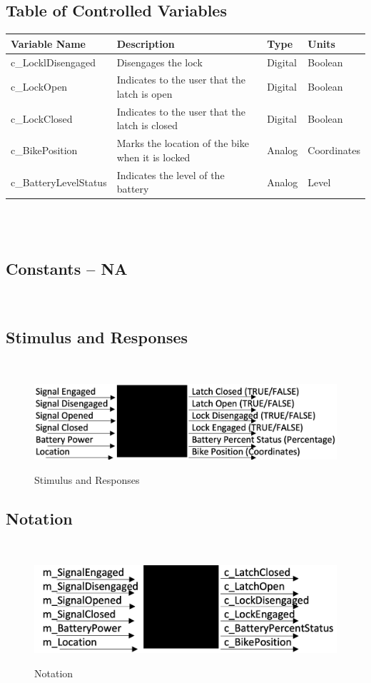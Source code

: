 \documentclass[12pt]{article}
\begin{document}
\subsection{Table of Controlled Variables}

\begin{minipage}{\textwidth}
\renewcommand*{\arraystretch}{1.5}
\begin{tabular}{| p{} | p{} | p{} | p{} |}
 \hline
 Variable Name & Description & Type & Units \\ 
  \hline
 c\_LocklDisengaged & Disengages the lock & Digital & Boolean \\ 
  \hline
 c\_LockOpen & Indicates to the user that the latch is open & Digital & Boolean \\ 
  \hline
 c\_LockClosed& Indicates to the user that the latch is closed & Digital & Boolean \\ 
  \hline
 c\_BikePosition & Marks the location of the bike when it is locked & Analog & Coordinates \\ 
  \hline
 c\_BatteryLevelStatus & Indicates the level of the battery & Analog & Level \\ 
 \hline
\end{tabular}
\end{minipage}\\
~\newline
\subsection{Constants -- NA}
~\newline
\subsection{Stimulus and Responses}
~\newline
\begin{figure}[h!]
 \begin{center}
 {
 \includegraphics[width=0.6\linewidth]{./StimulusandResponses.jpeg}
 }
 \caption{\label{Stimulus and Responses} Stimulus and Responses}
 \end{center}
 \end{figure}
\subsection{Notation}
~\newline
\begin{figure}[h!]
 \begin{center}
 {
 \includegraphics[width=0.6\linewidth]{./Notation.jpeg}
 }
 \caption{\label{Notation} Notation}
 \end{center}
 \end{figure}
~\newpage
\end{document}
